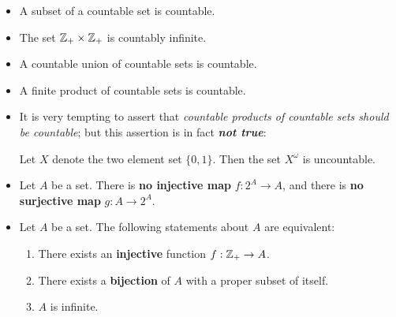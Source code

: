 \documentclass[11pt]{article}
\begin{document}
\begin{itemize}
\item \begin{corollary}
A subset of a countable set is countable.
\end{corollary}

\item \begin{corollary}
The set ${\mathbb Z}_{+} \times {\mathbb Z}_{+}$ is countably infinite.
\end{corollary}

\item \begin{proposition}
A countable union of countable sets is countable.
\end{proposition}

\item \begin{proposition}
A finite product of countable sets is countable.
\end{proposition}

\item It is very tempting to assert that \emph{countable products of countable sets should be countable}; but this assertion is in fact \emph{\textbf{not true}}:
\begin{theorem}
Let $X$ denote the two element set $\{0, 1\}$. Then the set $X^{\omega}$ is  uncountable.
\end{theorem}

\item \begin{theorem}
Let $A$ be a set. There is \textbf{no injective map} $f: 2^A  \rightarrow A$, and there is \textbf{no surjective map} $g: A  \rightarrow 2^A$.
\end{theorem}

\item \begin{proposition}
Let $A$ be a set. The following statements about $A$ are equivalent:
\begin{enumerate}
\item There exists an \textbf{injective} function $f : {\mathbb Z}_{+} \rightarrow A$.
\item There exists a \textbf{bijection} of $A$ with a proper subset of itself.
\item $A$ is infinite.
\end{enumerate}
\end{proposition}
\end{itemize}
\end{document}
